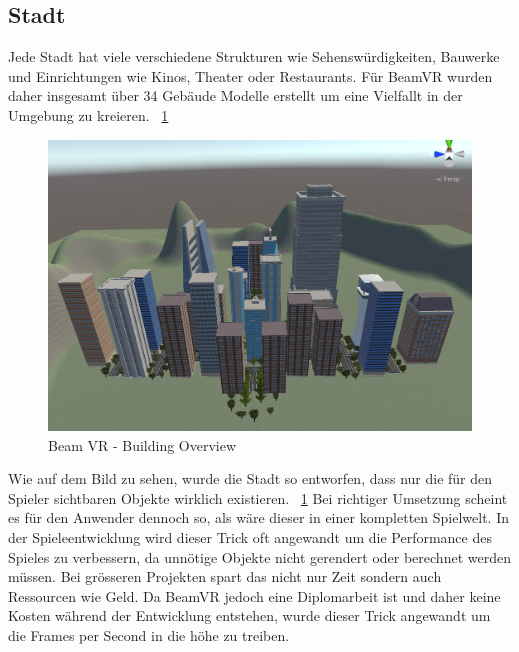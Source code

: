 \subsection{Stadt}\label{subsec:city}
Jede Stadt hat viele verschiedene Strukturen wie Sehensw\"urdigkeiten, Bauwerke und Einrichtungen wie Kinos, Theater oder Restaurants.
F\"ur BeamVR wurden daher insgesamt \"uber 34 Geb\"aude Modelle erstellt um eine Vielfallt in der Umgebung zu kreieren.
~\ref{fig:beamvr_building-variety}

\begin {figure}
    \includegraphics[scale=0.18]{pics/beamvr_building-variety}
    \caption{Beam VR - Building Overview}
    \label{fig:beamvr_building-variety}
\end {figure}

Wie auf dem Bild zu sehen, wurde die Stadt so entworfen, dass nur die für den Spieler sichtbaren Objekte wirklich existieren.
~\ref{fig:beamvr_building-variety}
Bei richtiger Umsetzung scheint es für den Anwender dennoch so, als w\"are dieser in einer kompletten Spielwelt.
In der Spieleentwicklung wird dieser Trick oft angewandt um die Performance des Spieles zu verbessern, da unn\"otige Objekte nicht gerendert oder berechnet werden m\"ussen.
Bei gr\"osseren Projekten spart das nicht nur Zeit sondern auch Ressourcen wie Geld.
Da BeamVR jedoch eine Diplomarbeit ist und daher keine Kosten w\"ahrend der Entwicklung entstehen, wurde dieser Trick angewandt
um die Frames per Second in die h\"ohe zu treiben.


